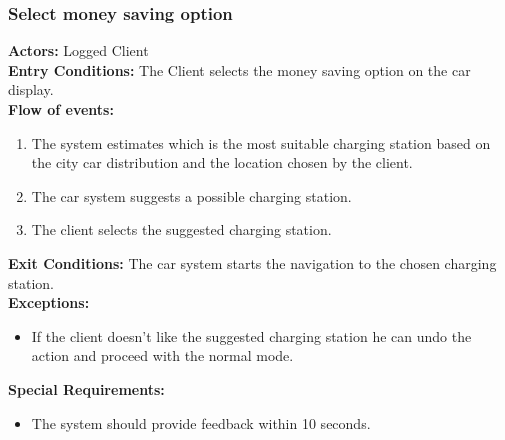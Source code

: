 \subsubsection{Select money saving option}
%
\textbf{Actors:}
Logged Client \\
%
\textbf{Entry Conditions:}
The Client selects the money saving option on the car display.\\
%
\textbf{Flow of events:}
\begin{enumerate}
\item The system estimates which is the most suitable charging station based on the city car distribution and the location chosen by the client. 
\item The car system suggests a possible charging station.
\item The client selects the suggested charging station.
\end{enumerate}
%
\textbf{Exit Conditions:}
The car system starts the navigation to the chosen charging station. \\
%
\textbf{Exceptions:}
\begin{itemize}
\item If the client doesn't like the suggested charging station he can undo the action and proceed with the normal mode.
\end{itemize}
%
\textbf{Special Requirements:}
\begin{itemize}
\item The system should provide feedback within 10 seconds.
\end{itemize}
